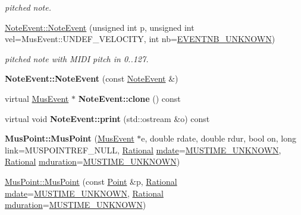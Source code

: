 \begin{DoxyCompactItemize}
\begin{DoxyCompactList}\small\item\em pitched note. \end{DoxyCompactList}\item 
\mbox{\label{group__segment_ga135e904aa3f5ea4d375e451281fe5323}} 
\mbox{\hyperlink{group__segment_ga135e904aa3f5ea4d375e451281fe5323}{Note\+Event\+::\+Note\+Event}} (unsigned int p, unsigned int vel=Mus\+Event\+::\+U\+N\+D\+E\+F\+\_\+\+V\+E\+L\+O\+C\+I\+TY, int nb=\mbox{\hyperlink{group__general_gac3b19762b16f33de03662fd4289fe5a9}{E\+V\+E\+N\+T\+N\+B\+\_\+\+U\+N\+K\+N\+O\+WN}})
\begin{DoxyCompactList}\small\item\em pitched note with M\+I\+DI pitch in 0..127. \end{DoxyCompactList}\item 
\mbox{\label{group__segment_ga9250db2a9fadb2184d60187e38ee02cc}} 
{\bfseries Note\+Event\+::\+Note\+Event} (const \mbox{\hyperlink{classNoteEvent}{Note\+Event}} \&)
\item 
\mbox{\label{group__segment_ga2fe5abb4cd9fbe000b1ec13114d60049}} 
virtual \mbox{\hyperlink{classMusEvent}{Mus\+Event}} $\ast$ {\bfseries Note\+Event\+::clone} () const
\item 
\mbox{\label{group__segment_gafa25174e584b872e814643c895cad283}} 
virtual void {\bfseries Note\+Event\+::print} (std\+::ostream \&o) const
\item 
\mbox{\label{group__segment_ga006e3062fd920202aab9e36f6a0e394e}} 
{\bfseries Mus\+Point\+::\+Mus\+Point} (\mbox{\hyperlink{classMusEvent}{Mus\+Event}} $\ast$e, double rdate, double rdur, bool on, long link=M\+U\+S\+P\+O\+I\+N\+T\+R\+E\+F\+\_\+\+N\+U\+LL, \mbox{\hyperlink{classRational}{Rational}} \mbox{\hyperlink{classMusPoint_a88d1f2efdc00dc80985bbe76356099b2}{mdate}}=\mbox{\hyperlink{group__general_gae862a9d955eb3154601efb64980ac24b}{M\+U\+S\+T\+I\+M\+E\+\_\+\+U\+N\+K\+N\+O\+WN}}, \mbox{\hyperlink{classRational}{Rational}} \mbox{\hyperlink{classMusPoint_a2f89f6b4930b75e633d8b3cd3e461aa2}{mduration}}=\mbox{\hyperlink{group__general_gae862a9d955eb3154601efb64980ac24b}{M\+U\+S\+T\+I\+M\+E\+\_\+\+U\+N\+K\+N\+O\+WN}})
\item 
\mbox{\hyperlink{group__segment_ga1bb17bef698401de18bc814c7f965999}{Mus\+Point\+::\+Mus\+Point}} (const \mbox{\hyperlink{classPoint}{Point}} \&p, \mbox{\hyperlink{classRational}{Rational}} \mbox{\hyperlink{classMusPoint_a88d1f2efdc00dc80985bbe76356099b2}{mdate}}=\mbox{\hyperlink{group__general_gae862a9d955eb3154601efb64980ac24b}{M\+U\+S\+T\+I\+M\+E\+\_\+\+U\+N\+K\+N\+O\+WN}}, \mbox{\hyperlink{classRational}{Rational}} \mbox{\hyperlink{classMusPoint_a2f89f6b4930b75e633d8b3cd3e461aa2}{mduration}}=\mbox{\hyperlink{group__general_gae862a9d955eb3154601efb64980ac24b}{M\+U\+S\+T\+I\+M\+E\+\_\+\+U\+N\+K\+N\+O\+WN}})

\end{DoxyCompactItemize}
